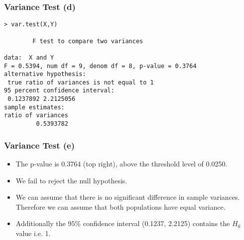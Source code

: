 \documentclass[a4]{beamer}
\begin{document}
\begin{frame}[fragile]
\frametitle{Variance Test (d)}
\begin{verbatim}
> var.test(X,Y)

        F test to compare two variances

data:  X and Y
F = 0.5394, num df = 9, denom df = 8, p-value = 0.3764
alternative hypothesis: 
 true ratio of variances is not equal to 1
95 percent confidence interval:
 0.1237892 2.2125056
sample estimates:
ratio of variances
         0.5393782
\end{verbatim}

\end{frame}

\begin{frame}
\frametitle{Variance Test (e)}
\begin{itemize}
\item The p-value is 0.3764 (top right), above the threshold level of 0.0250.
\item We fail to reject the null hypothesis.
\item We can assume that there is no significant difference in sample variances. Therefore we can assume that both populations have equal variance.
\item Additionally the $95\%$ confidence interval (0.1237, 2.2125) contains the $H_0$ value i.e. 1.
\end{itemize}
\end{frame}
\end{document}
